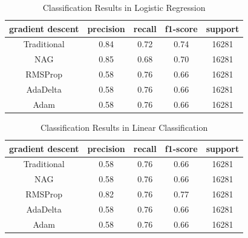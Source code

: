 \documentclass[journal, a4paper]{IEEEtran}
\begin{document}
    \begin{table}[!hbt]
		\begin{center}
		\caption{Classification Results in Logistic Regression}
		\label{table_1}
		\begin{tabular}{|c|c|c|c|c|}
			\hline
			gradient descent  & precision & recall & f1-score & support \\
			\hline
			Traditional & 0.84 & 0.72 & 0.74  & 16281 \\
			\hline
			NAG & 0.85 & 0.68 & 0.70  & 16281 \\
			\hline
			RMSProp & 0.58 & 0.76 & 0.66 & 16281 \\
			\hline
            AdaDelta & 0.58 & 0.76 & 0.66 & 16281 \\
			\hline
            Adam & 0.58 & 0.76 & 0.66 & 16281 \\
			\hline
		\end{tabular}
		\end{center}
	\end{table}

    \begin{table}[!hbt]
		\begin{center}
		\caption{Classification Results in Linear Classification}
		\label{table_2}
		\begin{tabular}{|c|c|c|c|c|}
			\hline
			gradient descent  & precision & recall & f1-score & support \\
			\hline
			Traditional & 0.58 & 0.76 & 0.66 & 16281 \\
			\hline
			NAG & 0.58 & 0.76 & 0.66  & 16281 \\
			\hline
			RMSProp & 0.82 & 0.76 & 0.77 & 16281 \\
			\hline
            AdaDelta & 0.58 & 0.76 & 0.66 & 16281 \\
			\hline
            Adam & 0.58 & 0.76 & 0.66 & 16281 \\
			\hline
		\end{tabular}
		\end{center}
	\end{table}
\end{document}
